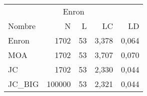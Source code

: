 \begin{tabular}{lrrrr}
	\toprule
	\multicolumn{5}{c}{Enron}             \\[3pt]
	Nombre  & N      & L  & LC    & LD    \\
	\midrule
	Enron   & 1702   & 53 & 3,378 & 0,064 \\[3pt]
	MOA     & 1702   & 53 & 3,707 & 0,070 \\[3pt]
	JC      & 1702   & 53 & 2,330 & 0,044 \\[3pt]
	JC\_BIG & 100000 & 53 & 2,321 & 0,044 \\
	\bottomrule
\end{tabular}
